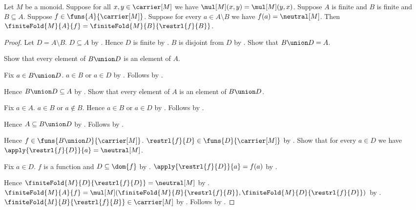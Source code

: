 \begin{theorem}\label{monoid_finite_fold_neutral_extension}
    Let $M$ be a monoid.
    Suppose for all $x,y\in\carrier[M]$ we have
        $\mul[M](x,y)=\mul[M](y,x)$.
    Suppose $A$ is finite and $B$ is finite and $B\subseteq A$.
    Suppose $f\in\funs{A}{\carrier[M]}$.
    Suppose for every $a\in A\setminus B$ we have
        $f(a)=\neutral[M]$.
    Then
        $\finiteFold{M}{A}{f}
            =\finiteFold{M}{B}{\restrl{f}{B}}$.
\end{theorem}
\begin{proof}
    Let $D=A\setminus B$.
    $D\subseteq A$ by .
    Hence $D$ is finite by .
    $B$ is disjoint from $D$ by
        .
    Show that $B\union D=A$.
    \begin{subproof}
        Show that every element of $B\union D$ is an element of $A$.
        \begin{subproof}
            Fix $a\in B\union D$.
            $a\in B$ or $a\in D$ by .
            Follows by .
        \end{subproof}
        Hence $B\union D\subseteq A$ by .
        Show that every element of $A$ is an element of $B\union D$.
        \begin{subproof}
            Fix $a\in A$.
            $a\in B$ or $a\notin B$.
            Hence $a\in B$ or $a\in D$ by .
            Follows by .
        \end{subproof}
        Hence $A\subseteq B\union D$ by .
        Follows by .
    \end{subproof}
    Hence $f\in\funs{B\union D}{\carrier[M]}$.
    $\restrl{f}{D}\in\funs{D}{\carrier[M]}$ by
        .
    Show that for every $a\in D$ we have
        $\apply{\restrl{f}{D}}{a}=\neutral[M]$.
    \begin{subproof}
        Fix $a\in D$.
        $f$ is a function and $D\subseteq\dom{f}$ by
            .
        $\apply{\restrl{f}{D}}{a}=f(a)$ by
            .
    \end{subproof}
    Hence $\finiteFold{M}{D}{\restrl{f}{D}}=\neutral[M]$ by
        .
    $\finiteFold{M}{A}{f}
        =\mul[M](\finiteFold{M}{B}{\restrl{f}{B}},
            \finiteFold{M}{D}{\restrl{f}{D}})$ by
        .
    $\finiteFold{M}{B}{\restrl{f}{B}}\in\carrier[M]$ by
        .
    Follows by
        .
\end{proof}

